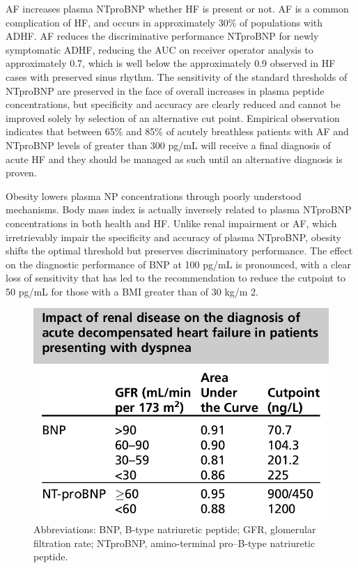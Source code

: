 \documentclass[14pt,a4paper,onecolumn]{extarticle}
\begin{document}
AF increases plasma NTproBNP whether HF is present or not. AF is a common complication of HF, and occurs in approximately 30\% of populations with ADHF. AF reduces the discriminative performance NTproBNP for newly symptomatic ADHF, reducing the AUC on receiver operator analysis to approximately 0.7, which is well below the approximately 0.9 observed in HF cases with preserved sinus rhythm.  The sensitivity of the standard thresholds of NTproBNP are preserved in the face of overall increases in plasma peptide concentrations, but specificity and accuracy are clearly reduced and cannot be improved solely by selection of an alternative cut point. Empirical observation indicates that between 65\% and 85\% of acutely breathless patients with AF and NTproBNP levels of greater than 300 pg/mL will receive a final diagnosis of acute HF and they should be managed as such until an alternative diagnosis is proven.  \citep{Richards2013}

Obesity lowers plasma NP concentrations through poorly understood mechanisms. Body mass index is actually inversely related to plasma NTproBNP concentrations in both health and HF. Unlike renal impairment or AF, which irretrievably impair the specificity and accuracy of plasma NTproBNP, obesity shifts the optimal threshold but preserves discriminatory performance. The effect on the diagnostic performance of BNP at 100 pg/mL is pronounced, with a clear loss of sensitivity that has led to the recommendation to reduce the cutpoint to 50 pg/mL for those with a BMI greater than of 30 kg/m 2. \citep{Daniels2006}

\begin{figure}   \includegraphics{../../images/NP_obesity.png}   \caption{Abbreviations: BNP, B-type natriuretic peptide; GFR, glomerular filtration rate; NTproBNP, amino-terminal pro–B-type natriuretic peptide. \citep{DeFilippi2008}}   \label{NP_obesity} \end{figure}
\end{document}
